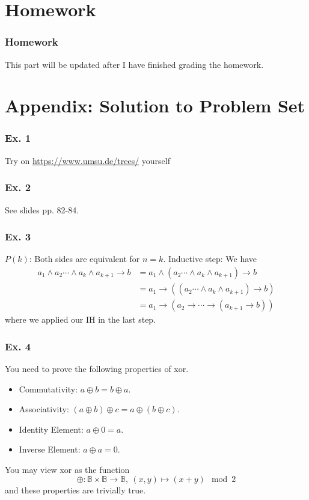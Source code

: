 \documentclass[aspectratio=169]{beamer}
\begin{document}
\section{Homework}
\begin{frame}
  \frametitle{Homework}
  This part will be updated after I have finished grading the homework.
\end{frame}
\section{Appendix: Solution to Problem Set}
\begin{frame}
  \frametitle{Ex. 1}
  Try on \url{ https://www.umsu.de/trees/} yourself
\end{frame}
\begin{frame}
  \frametitle{Ex. 2}
  See slides pp. 82-84. 
\end{frame}
\begin{frame}
  \frametitle{Ex. 3}
  $P(k)$: Both sides are equivalent for $n=k$.
  Inductive step: We have
  \begin{align*}
    a_1 \land a_2 \cdots \land a_k \land a_{k+1} \rightarrow b&= a_1 \land \left(a_2 \cdots \land a_k \land a_{k+1}\right) \rightarrow b \\
    &=a_1\rightarrow \left(\left(a_2 \cdots \land a_k \land a_{k+1}\right) \rightarrow b\right) \\
    &=a_1 \rightarrow \left(a_2 \rightarrow \cdots \rightarrow \left(a_{k+1} \rightarrow b\right)\right)
  \end{align*}
  where we applied our IH in the last step.
\end{frame}
\begin{frame}
  \frametitle{Ex. 4}
  You need to prove the following properties of xor.
  \begin{itemize}
    \item Commutativity: $a\oplus b = b\oplus a$. 
    \item Associativity: $\left(a\oplus b\right)\oplus c = a\oplus \left(b\oplus c\right)$. 
    \item Identity Element: $a\oplus 0 = a$.
    \item Inverse Element: $a\oplus a = 0$.
  \end{itemize}
  You may view xor as the function 
  \begin{equation*}
    \oplus: \mathbb{B}\times \mathbb{B} \to \mathbb{B}, \ \left(x, y\right)\mapsto \left(x + y\right)\mod 2
  \end{equation*}
  and these properties are trivially true.
\end{frame}
\end{document}

